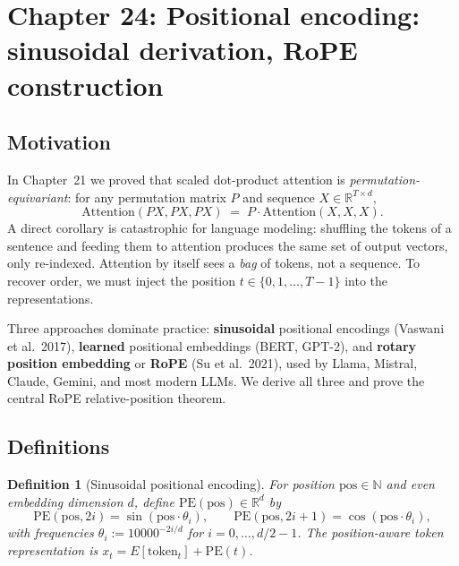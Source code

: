 \documentclass[11pt]{article}
\newtheorem{definition}[theorem]{Definition}
\theoremstyle{remark}
\begin{document}

\section*{Chapter 24: Positional encoding: sinusoidal derivation, RoPE construction}

\subsection*{Motivation}

In Chapter~21 we proved that scaled dot-product attention is \emph{permutation-equivariant}: for any permutation matrix $P$ and sequence $X \in \mathbb{R}^{T \times d}$,
\[
\mathrm{Attention}(PX, PX, PX) \;=\; P \cdot \mathrm{Attention}(X, X, X).
\]
A direct corollary is catastrophic for language modeling: shuffling the tokens of a sentence and feeding them to attention produces the same set of output vectors, only re-indexed. Attention by itself sees a \emph{bag} of tokens, not a sequence. To recover order, we must inject the position $t \in \{0, 1, \ldots, T-1\}$ into the representations.

Three approaches dominate practice: \textbf{sinusoidal} positional encodings (Vaswani et al.\ 2017), \textbf{learned} positional embeddings (BERT, GPT-2), and \textbf{rotary position embedding} or \textbf{RoPE} (Su et al.\ 2021), used by Llama, Mistral, Claude, Gemini, and most modern LLMs. We derive all three and prove the central RoPE relative-position theorem.

\subsection*{Definitions}

\begin{definition}[Sinusoidal positional encoding]
For position $\mathrm{pos} \in \mathbb{N}$ and even embedding dimension $d$, define $\mathrm{PE}(\mathrm{pos}) \in \mathbb{R}^d$ by
\[
\mathrm{PE}(\mathrm{pos}, 2i) = \sin(\mathrm{pos}\cdot \theta_i), \qquad
\mathrm{PE}(\mathrm{pos}, 2i+1) = \cos(\mathrm{pos}\cdot \theta_i),
\]
with frequencies $\theta_i := 10000^{-2i/d}$ for $i = 0, \ldots, d/2 - 1$. The position-aware token representation is $x_t = E[\mathrm{token}_t] + \mathrm{PE}(t)$.
\end{definition}
\end{document}
